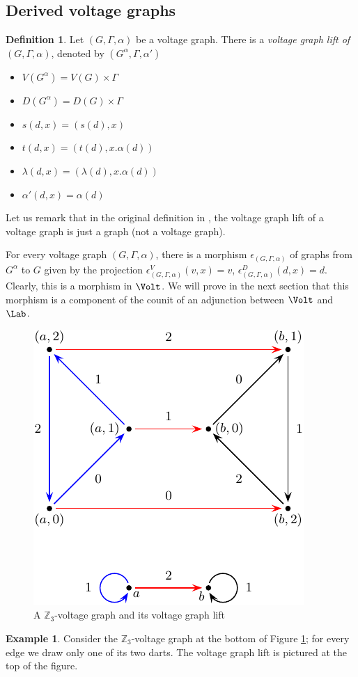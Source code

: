 \documentclass{amsart}
\theoremstyle{definition}
\newtheorem{definition}[theorem]{Definition}
\newtheorem{example}[theorem]{Example}
\begin{document}
\subsection{Derived voltage graphs}


\begin{definition}\cite{gross2001topological}
\label{def:derived} 
Let $(G,Γ,α)$ be a voltage graph. There is a {\em voltage graph lift of
$(G,Γ,α)$},
denoted by $(G^α,Γ,α')$
\begin{itemize}
\item $V(G^α)=V(G)×Γ$
\item $D(G^α)=D(G)×Γ$
\item $s(d,x)=(s(d),x)$
\item $t(d,x)=(t(d),x.α(d))$
\item $λ(d,x)=(λ(d),x.α(d))$
\item $α'(d,x)=α(d)$
\end{itemize}
\end{definition}

Let us remark that in the original definition in \cite{gross1974voltage}, the
voltage graph lift of a voltage graph is just a graph (not a voltage graph).

For every voltage graph $(G,Γ,α)$, there is a morphism $\epsilon_{(G,Γ,α)}$ of graphs
from $G^α$ to $G$ given by the projection $\epsilon_{(G,Γ,α)}^V(v,x)=v$,
$\epsilon_{(G,Γ,α)}^D(d,x)=d$. Clearly, this is a morphism in $\Volt$. We will prove in
the next section that this morphism 
is a component of the counit of an adjunction between $\Volt$ and $\Lab$.

\begin{figure}
\begin{center}
\includegraphics{derived1}
\caption{A $\mathbb Z_3$-voltage graph and its voltage graph lift}
\label{fig:derived}
\end{center}
\end{figure}
\begin{example}
Consider the $\mathbb Z_3$-voltage graph at the bottom of
Figure \ref{fig:derived}; for every edge we draw only one of its
two darts. The voltage graph lift is pictured at the top of the figure.
\end{example}
\end{document}

